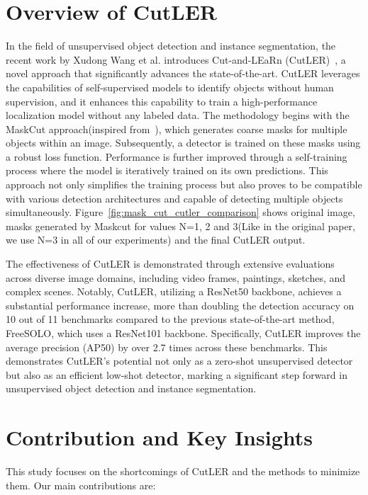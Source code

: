 \section{Overview of CutLER}
In the field of unsupervised object detection and instance segmentation, the recent work by Xudong Wang et al. introduces Cut-and-LEaRn (CutLER)~\cite{wang2023cut}, a novel approach that significantly advances the state-of-the-art. CutLER leverages the capabilities of self-supervised models to identify objects without human supervision, and it enhances this capability to train a high-performance localization model without any labeled data. The methodology begins with the MaskCut approach(inspired from~\cite{wang2022tokencut}), which generates coarse masks for multiple objects within an image. Subsequently, a detector is trained on these masks using a robust loss function. Performance is further improved through a self-training process where the model is iteratively trained on its own predictions. This approach not only simplifies the training process but also proves to be compatible with various detection architectures and capable of detecting multiple objects simultaneously. Figure~\ref{fig:mask_cut_cutler_comparison} shows original image, masks generated by Maskcut for values N=1, 2 and 3(Like in the original paper, we use N=3 in all of our experiments) and the final CutLER output.

The effectiveness of CutLER is demonstrated through extensive evaluations across diverse image domains, including video frames, paintings, sketches, and complex scenes. Notably, CutLER, utilizing a ResNet50 backbone, achieves a substantial performance increase, more than doubling the detection accuracy on 10 out of 11 benchmarks compared to the previous state-of-the-art method, FreeSOLO, which uses a ResNet101 backbone. Specifically, CutLER improves the average precision (AP50) by over 2.7 times across these benchmarks. This demonstrates CutLER's potential not only as a zero-shot unsupervised detector but also as an efficient low-shot detector, marking a significant step forward in unsupervised object detection and instance segmentation.

\section{Contribution and Key Insights}

This study focuses on the shortcomings of CutLER and the methods to minimize them. Our main contributions are:

